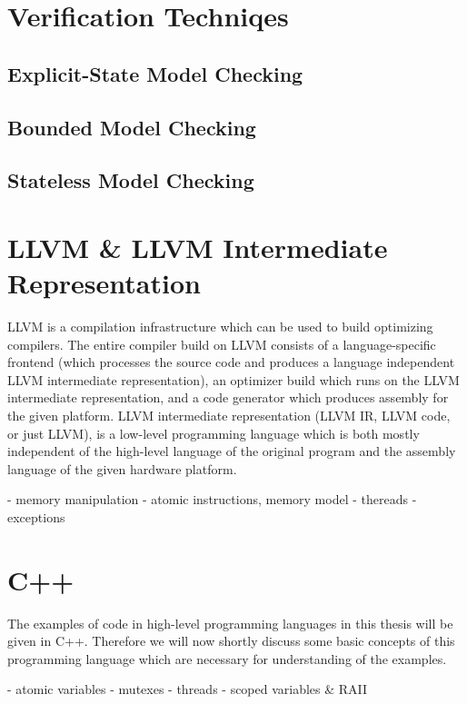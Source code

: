 \section{Verification Techniqes}

\subsection{Explicit-State Model Checking}

\subsection{Bounded Model Checking}

\subsection{Stateless Model Checking}

\section{LLVM \& LLVM Intermediate Representation}

LLVM is a compilation infrastructure which can be used to build optimizing compilers.
The entire compiler build on LLVM consists of a language-specific frontend (which processes the source code and produces a language independent LLVM intermediate representation), an optimizer build which runs on the LLVM intermediate representation, and a code generator which produces assembly for the given platform.
LLVM intermediate representation (LLVM IR, LLVM code, or just LLVM), is a low-level programming language which is both mostly independent of the high-level language of the original program and the assembly language of the given hardware platform.

- memory manipulation
- atomic instructions, memory model
- thereads
- exceptions

\section{C++}

The examples of code in high-level programming languages in this thesis will be given in C++.
Therefore we will now shortly discuss some basic concepts of this programming language which are necessary for understanding of the examples.

- atomic variables
- mutexes
- threads
- scoped variables \& RAII
